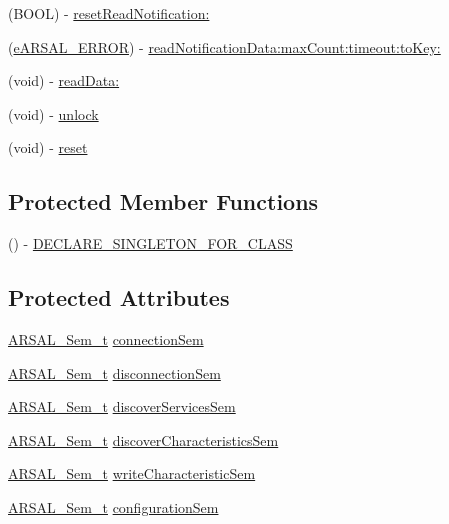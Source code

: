 \begin{DoxyCompactItemize}
\item 
(B\+O\+OL) -\/ \hyperlink{interfaceARSAL__BLEManager_a35c00081083a3cf9716ebfc73adbaeec}{reset\+Read\+Notification\+:}
\item 
(\hyperlink{ARSAL__Error_8h_a95978608019620b9d7e573ad874e5889}{e\+A\+R\+S\+A\+L\+\_\+\+E\+R\+R\+OR}) -\/ \hyperlink{interfaceARSAL__BLEManager_a631ffa16a79854a57ebf744509038859}{read\+Notification\+Data\+:max\+Count\+:timeout\+:to\+Key\+:}
\item 
(void) -\/ \hyperlink{interfaceARSAL__BLEManager_aec8afef362675fb59e03aa2b81c39141}{read\+Data\+:}
\item 
(void) -\/ \hyperlink{interfaceARSAL__BLEManager_af90789b4d2eba4b84a886d689e9a0f56}{unlock}
\item 
(void) -\/ \hyperlink{interfaceARSAL__BLEManager_aa7bfd6655251871a975263ff249b2074}{reset}
\end{DoxyCompactItemize}
\subsection*{Protected Member Functions}
\begin{DoxyCompactItemize}
\item 
() -\/ \hyperlink{interfaceARSAL__BLEManager_aea5e1d03fac306f00ae920a87044020c}{D\+E\+C\+L\+A\+R\+E\+\_\+\+S\+I\+N\+G\+L\+E\+T\+O\+N\+\_\+\+F\+O\+R\+\_\+\+C\+L\+A\+SS}
\end{DoxyCompactItemize}
\subsection*{Protected Attributes}
\begin{DoxyCompactItemize}
\item 
\hyperlink{ARSAL__Sem_8h_a74eaf25f9acaab7ff185cb3c30ffda1c}{A\+R\+S\+A\+L\+\_\+\+Sem\+\_\+t} \hyperlink{interfaceARSAL__BLEManager_a48ce3c205ac6334199a7e0c264a2073d}{connection\+Sem}
\item 
\hyperlink{ARSAL__Sem_8h_a74eaf25f9acaab7ff185cb3c30ffda1c}{A\+R\+S\+A\+L\+\_\+\+Sem\+\_\+t} \hyperlink{interfaceARSAL__BLEManager_a57a0bed8439a2bac7c30f4ee3375daa4}{disconnection\+Sem}
\item 
\hyperlink{ARSAL__Sem_8h_a74eaf25f9acaab7ff185cb3c30ffda1c}{A\+R\+S\+A\+L\+\_\+\+Sem\+\_\+t} \hyperlink{interfaceARSAL__BLEManager_a088ad383094439d68a3c7b617f3e014b}{discover\+Services\+Sem}
\item 
\hyperlink{ARSAL__Sem_8h_a74eaf25f9acaab7ff185cb3c30ffda1c}{A\+R\+S\+A\+L\+\_\+\+Sem\+\_\+t} \hyperlink{interfaceARSAL__BLEManager_a5b4ed96218b90c022292e20047d90628}{discover\+Characteristics\+Sem}
\item 
\hyperlink{ARSAL__Sem_8h_a74eaf25f9acaab7ff185cb3c30ffda1c}{A\+R\+S\+A\+L\+\_\+\+Sem\+\_\+t} \hyperlink{interfaceARSAL__BLEManager_aa6c61e4bd4aba9777de160f538f28850}{write\+Characteristic\+Sem}
\item 
\hyperlink{ARSAL__Sem_8h_a74eaf25f9acaab7ff185cb3c30ffda1c}{A\+R\+S\+A\+L\+\_\+\+Sem\+\_\+t} \hyperlink{interfaceARSAL__BLEManager_ae3c5e30776574be97aa83842636f33f4}{configuration\+Sem}
\end{DoxyCompactItemize}
